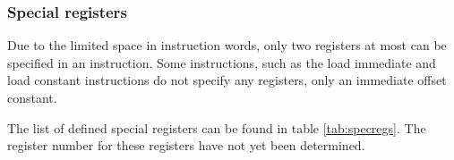 

\subsubsection{Special registers}

Due to the limited space in instruction words, only two registers at most can be
specified in an instruction. Some instructions, such as the load immediate and
load constant instructions do not specify any registers, only an immediate
offset constant.

The list of defined special registers can be found in table \ref{tab:specregs}.
The register number for these registers have not yet been determined.



